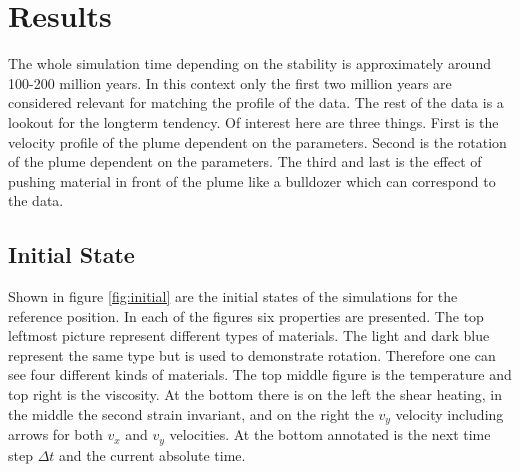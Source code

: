 \documentclass[12pt]{scrreprt}
\begin{document}
\section{Results}
The whole simulation time depending on the stability is approximately around 100-200 million years. In this context only the first two million years are considered relevant for matching the profile of the data. The rest of the data is a lookout for the longterm tendency. Of interest here are three things. First is the velocity profile of the plume dependent on the parameters. Second is the rotation of the plume dependent on the parameters. The third and last is the effect of pushing material in front of the plume like a bulldozer which can correspond to the data.
\subsection{Initial State}
Shown in figure \ref{fig:initial} are the initial states of the simulations for the reference position. In each of the figures six properties are presented. The top leftmost picture represent different types of materials. The light and dark blue represent the same type but is used to demonstrate rotation. Therefore one can see four different kinds of materials. The top middle figure is the temperature and top right is the viscosity. At the bottom there is on the left the shear heating, in the middle the second strain invariant, and on the right the $v_y$ velocity including arrows for both $v_x$ and $v_y$ velocities. At the bottom annotated is the next time step $\Delta t$ and the current absolute time.
\end{document}
